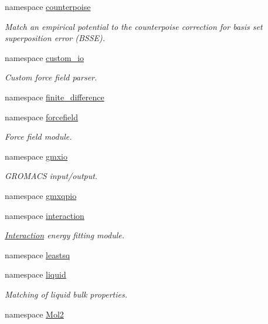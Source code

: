 \begin{DoxyCompactItemize}
\item 
namespace \hyperlink{namespaceforcebalance_1_1counterpoise}{counterpoise}
\begin{DoxyCompactList}\small\item\em Match an empirical potential to the counterpoise correction for basis set superposition error (B\-S\-S\-E). \end{DoxyCompactList}\item 
namespace \hyperlink{namespaceforcebalance_1_1custom__io}{custom\-\_\-io}
\begin{DoxyCompactList}\small\item\em Custom force field parser. \end{DoxyCompactList}\item 
namespace \hyperlink{namespaceforcebalance_1_1finite__difference}{finite\-\_\-difference}
\item 
namespace \hyperlink{namespaceforcebalance_1_1forcefield}{forcefield}
\begin{DoxyCompactList}\small\item\em Force field module. \end{DoxyCompactList}\item 
namespace \hyperlink{namespaceforcebalance_1_1gmxio}{gmxio}
\begin{DoxyCompactList}\small\item\em G\-R\-O\-M\-A\-C\-S input/output. \end{DoxyCompactList}\item 
namespace \hyperlink{namespaceforcebalance_1_1gmxqpio}{gmxqpio}
\item 
namespace \hyperlink{namespaceforcebalance_1_1interaction}{interaction}
\begin{DoxyCompactList}\small\item\em \hyperlink{classforcebalance_1_1interaction_1_1Interaction}{Interaction} energy fitting module. \end{DoxyCompactList}\item 
namespace \hyperlink{namespaceforcebalance_1_1leastsq}{leastsq}
\item 
namespace \hyperlink{namespaceforcebalance_1_1liquid}{liquid}
\begin{DoxyCompactList}\small\item\em Matching of liquid bulk properties. \end{DoxyCompactList}\item 
namespace \hyperlink{namespaceforcebalance_1_1Mol2}{Mol2}
\item 

\end{DoxyCompactItemize}
